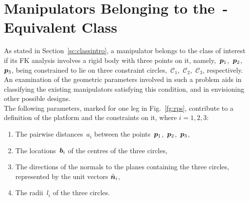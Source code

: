 \documentclass[DD]{iitmdiss}
\newcommand{\mref}[1]{\ref{#1}}
\newcommand{\mlabel}[1]{\label{#1}}
\newcommand{\sg}[1]{\emph{\color{blue} [SG: #1]}}
\begin{document}
\section{Manipulators Belonging to the~\rps-Equivalent Class}\mlabel{sc:classlist}
As stated in Section~\mref{sc:classintro}, a manipulator belongs to the class of interest if its FK analysis involves a rigid body with three points on it, namely,~$\bm{p}_1$,~$\bm{p}_2$,~$\bm{p}_3$, being constrained to lie on three constraint circles,~$\mathcal{C}_1$,~$\mathcal{C}_2$,~$\mathcal{C}_3$, respectively. An examination of the geometric parameters involved in such a problem aids in classifying the existing manipulators satisfying this condition, and in envisioning other possible designs. \\
The following parameters, marked for one leg in Fig.~\mref{fg:rps}, contribute to a definition of the platform and the constraints on it, where $i = 1, 2, 3$:
%
\begin{enumerate}
	\item The pairwise distances~$a_i$ between the points~$\bm{p}_1$,~$\bm{p}_2$,~$\bm{p}_3$, %
	\item The locations~$\bm{b}_i$ of the centres of the three circles, 
	\item The directions of the normals to the planes containing the three circles, represented by the unit vectors $\hat{\bm{n}}_i$,
	\item The radii~$l_i$ of the three circles.
\end{enumerate}
%
%
\end{document}

